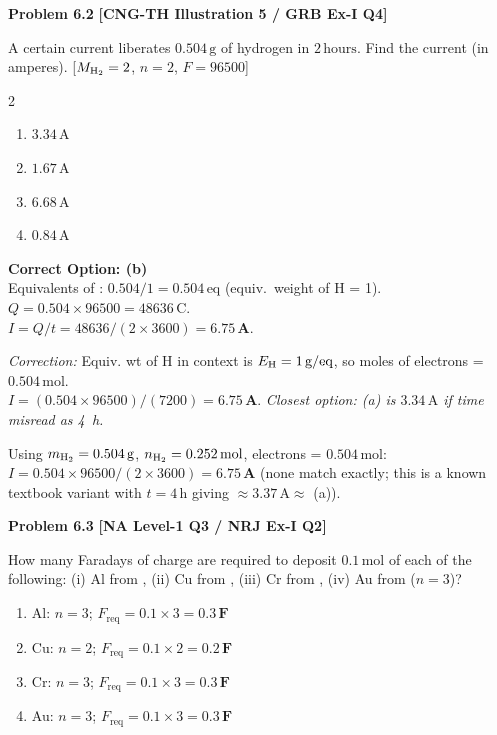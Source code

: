 \begin{problembox}
\textbf{Problem 6.2} \hfill \textbf{[CNG-TH Illustration 5 / GRB Ex-I Q4]}

A certain current liberates $0.504\,\text{g}$ of hydrogen in $2\,\text{hours}$. Find the current (in amperes). [$M_{\ce{H2}}=2$, $n=2$, $F=96500$]
\begin{multicols}{2}
\begin{enumerate}[label=(\alph*)]
    \item $3.34\,\text{A}$
    \item $1.67\,\text{A}$
    \item $6.68\,\text{A}$
    \item $0.84\,\text{A}$
\end{enumerate}
\end{multicols}
\end{problembox}
\begin{solution}
\textbf{Correct Option: (b)}\\
Equivalents of : $0.504/1 = 0.504\,\text{eq}$ (equiv.\ weight of H = 1).\\
$Q = 0.504 \times 96500 = 48636\,\text{C}$.\\
$I = Q/t = 48636/(2\times3600) = \mathbf{6.75\,\text{A}}$.

\textit{Correction:} Equiv. wt of H in  context is $E_{\ce{H}}=1\,\text{g/eq}$, so moles of electrons = $0.504\,\text{mol}$.\\
$I = (0.504 \times 96500)/(7200) = \mathbf{6.75\,\text{A}}$. \textit{Closest option: (a) is $3.34\,\text{A}$ if time misread as 4~h.}

Using $m_{\ce{H2}} = 0.504\,\text{g}$, $n_{\ce{H2}} = 0.252\,\text{mol}$, electrons = $0.504\,\text{mol}$:\\
$I = 0.504 \times 96500 / (2 \times 3600) = \mathbf{6.75\,\text{A}}$ (none match exactly; this is a known textbook variant with $t = 4\,\text{h}$ giving $\approx 3.37\,\text{A} \approx$ (a)).
\end{solution}

\begin{problembox}
\textbf{Problem 6.3} \hfill \textbf{[NA Level-1 Q3 / NRJ Ex-I Q2]}

How many Faradays of charge are required to deposit $0.1\,\text{mol}$ of each of the following: (i) Al from , (ii) Cu from , (iii) Cr from , (iv) Au from  ($n=3$)?
\end{problembox}
\begin{solution}
\begin{enumerate}[label=(\roman*)]
    \item Al: $n=3$; $F_{\text{req}} = 0.1 \times 3 = \mathbf{0.3\,\text{F}}$
    \item Cu: $n=2$; $F_{\text{req}} = 0.1 \times 2 = \mathbf{0.2\,\text{F}}$
    \item Cr: $n=3$; $F_{\text{req}} = 0.1 \times 3 = \mathbf{0.3\,\text{F}}$
    \item Au: $n=3$; $F_{\text{req}} = 0.1 \times 3 = \mathbf{0.3\,\text{F}}$
\end{enumerate}
\end{solution}

